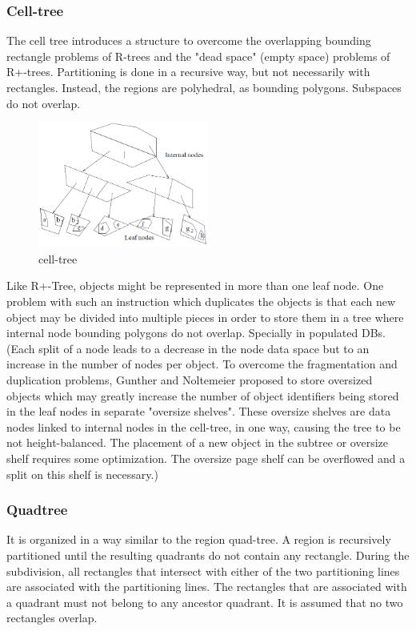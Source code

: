 \documentclass[a4paper,12pt]{article}
\begin{document}
\subsubsection{Cell-tree}
The cell tree introduces a structure to overcome the overlapping bounding rectangle problems of R-trees and the "dead space" (empty space) problems of R+-trees. Partitioning is done in a recursive way, but not necessarily with rectangles. Instead, the regions are polyhedral, as bounding polygons. Subspaces do not overlap.  
\begin{figure}
\centering
\includegraphics[width=0.5\textwidth]{celltree}
\caption{cell-tree}
\label{figcelltree}
\end{figure}

Like R+-Tree, objects might be represented in more than one leaf node. One problem with such an instruction which duplicates the objects is that each new object may be divided into multiple pieces in order to store them in a tree where internal node bounding polygons do not overlap. Specially in populated DBs. 
(Each split of a node leads to a decrease in the node data space but to an increase in the number of nodes per object. To overcome the fragmentation and duplication problems, Gunther and Noltemeier proposed to store oversized objects which may greatly increase the number of object identifiers being stored in the leaf nodes in separate "oversize shelves". These oversize shelves are data nodes linked to internal nodes in the cell-tree, in one way, causing the tree to be not height-balanced. The placement of a new object in the subtree or oversize shelf requires some optimization. The oversize page shelf can be overflowed and a split on this shelf is necessary.)
\subsubsection{Quadtree}
It is organized in a way similar to the region quad-tree. A region is recursively partitioned until the resulting quadrants do not contain any rectangle. During the subdivision, all rectangles that intersect with either of the two partitioning lines are associated with the partitioning lines. The rectangles that are associated with a quadrant must not belong to any ancestor quadrant. It is assumed that no two rectangles overlap.
\newpage
\end{document}
